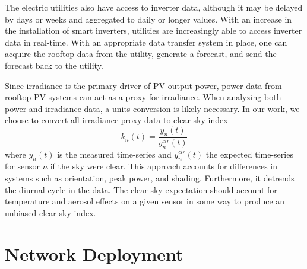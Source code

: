 The electric utilities also have access to inverter data, although it
may be delayed by days or weeks and aggregated to daily or longer values.
With an increase in the installation of smart inverters, utilities are
increasingly able to access inverter data in real-time.
With an appropriate data transfer system in place, one can acquire
the rooftop data from the utility, generate a forecast, and send the
forecast back to the utility.

Since irradiance is the primary driver of PV output power, power data
from rooftop PV systems can act as a proxy for irradiance.
When analyzing both power and irradiance data, a units conversion is
likely necessary.
In our work, we choose to convert all irradiance proxy data to
clear-sky index
\begin{equation}
\label{eq:clrind}
k_n(t) = \frac{y_n(t)}{y_n^{clr}(t)}
\end{equation}
where $y_n(t)$ is the measured time-series and $y_n^{clr}(t)$ the
expected time-series for sensor $n$ if the sky were clear.
This approach accounts for differences in systems such as orientation,
peak power, and shading.
Furthermore, it detrends the diurnal cycle in the data.
The clear-sky expectation should account for temperature and aerosol
effects on a given sensor in some way to produce an unbiased clear-sky
index.

\section{Network Deployment}


